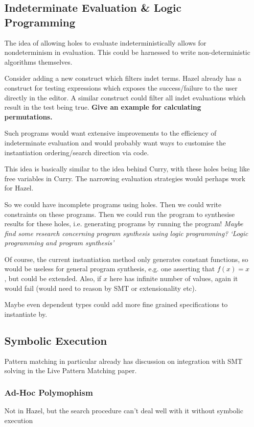 \subsection{Indeterminate Evaluation \& Logic Programming}
\label{sec:LogicProgramming}
The idea of allowing holes to evaluate indeterministically allows for nondeterminism in evaluation. This could be harnessed to write non-deterministic algorithms themselves.

Consider adding a new construct which filters indet terms. Hazel already has a construct for testing expressions which exposes the success/failure to the user directly in the editor. A similar construct could filter all indet evaluations which result in the test being true. \textbf{Give an example for calculating permutations.}

Such programs would want extensive improvements to the efficiency of indeterminate evaluation and would probably want ways to customise the instantiation ordering/search direction via code.

This idea is basically similar to the idea behind Curry, with these holes being like free variables in Curry. The narrowing evaluation strategies would perhaps work for Hazel.

So we could have incomplete programs using holes. Then we could write constraints on these programs. Then we could run the program to synthesise results for these holes, i.e. generating programs by running the program! \textit{Maybe find some research concerning program synthesis using logic programming? `Logic programming and program synthesis'}

Of course, the current instantiation method only generates constant functions, so would be useless for general program synthesis, e.g. one asserting that $f(x) = x$, but could be extended. Also, if $x$ here has infinite number of values, again it would fail (would need to reason by SMT or extensionality etc).

Maybe even dependent types could add more fine grained specifications to instantiate by.
\subsection{Symbolic Execution}
Pattern matching in particular already has discussion on integration with SMT solving in the Live Pattern Matching paper.

\subsubsection{Ad-Hoc Polymophism}
Not in Hazel, but the search procedure can't deal well with it without symbolic execution

